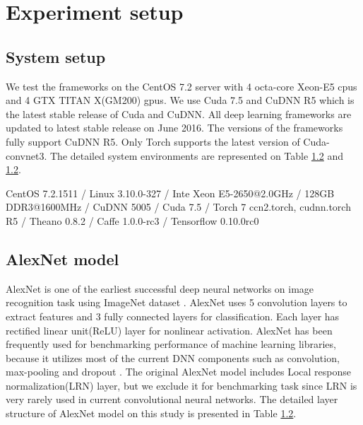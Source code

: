 \section{Experiment setup}

\subsection{System setup}
We test the frameworks on the CentOS 7.2 server with 4 octa-core Xeon-E5 cpus and 4 GTX TITAN X(GM200) gpus.
We use Cuda 7.5 and CuDNN R5 which is the latest stable release of Cuda and CuDNN.
All deep learning frameworks are updated to latest stable release on June 2016.
The versions of the frameworks fully support CuDNN R5.
Only Torch supports the latest version of Cuda-convnet3.
The detailed system environments are represented on Table \ref{} and \ref{}.

CentOS 7.2.1511 / Linux 3.10.0-327 / Inte Xeon E5-2650@2.0GHz / 128GB DDR3@1600MHz / CuDNN 5005 / Cuda 7.5 / Torch 7 ccn2.torch, cudnn.torch R5 / Theano 0.8.2 / Caffe 1.0.0-rc3 / Tensorflow 0.10.0rc0

\subsection{AlexNet model}
AlexNet \cite{} is one of the earliest successful deep neural networks on image recognition task using ImageNet dataset \cite{}.
AlexNet uses 5 convolution layers to extract features and 3 fully connected layers for classification.
Each layer has rectified linear unit(ReLU) layer for nonlinear activation.
AlexNet has been frequently used for benchmarking performance of machine learning libraries, because it utilizes most of the current DNN components such as convolution, max-pooling and dropout \cite{}.
The original AlexNet model includes Local response normalization(LRN) layer, but we exclude it for benchmarking task since LRN is very rarely used in current convolutional neural networks.
The detailed layer structure of AlexNet model on this study is presented in Table \ref{}.


